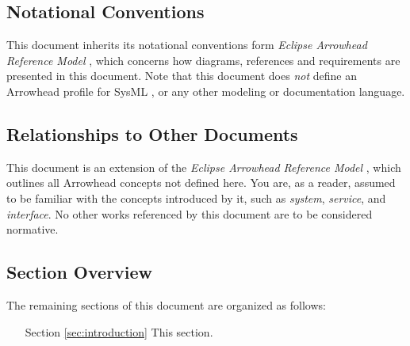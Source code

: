 \subsection{Notational Conventions}
\label{sec:introduction:conventions}

This document inherits its notational conventions form \textit{Eclipse Arrowhead Reference Model} \cite{palm2021reference}, which concerns how diagrams, references and requirements are presented in this document.
Note that this document does \textit{not} define an Arrowhead profile for SysML \cite{omg2019sysml}, or any other modeling or documentation language.

\subsection{Relationships to Other Documents}
\label{sec:introduction:relationships}

This document is an extension of the \textit{Eclipse Arrowhead Reference Model} \cite{palm2021reference}, which outlines all Arrowhead concepts not defined here.
You are, as a reader, assumed to be familiar with the concepts introduced by it, such as \textit{system}, \textit{service}, and \textit{interface}.
No other works referenced by this document are to be considered normative. 

\subsection{Section Overview}
\label{sec:introduction:sections}

The remaining sections of this document are organized as follows:
\vspace*{2mm}
\begin{itemize}[leftmargin=2cm,rightmargin=0pt,labelwidth=2cm,labelsep=0pt,itemindent=0pt,parsep=0.1cm,topsep=0.1cm,align=left]

\item[Section \ref{sec:introduction}]
This section.

\end{itemize}
